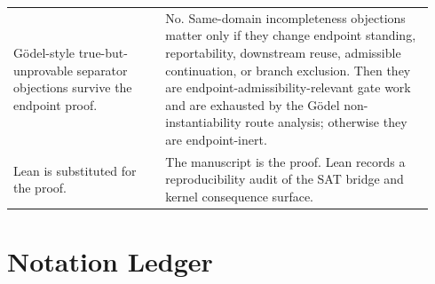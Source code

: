 \documentclass[11pt]{article}
\theoremstyle{definition}
\theoremstyle{remark}
\begin{document}
{\begin{longtable}{>{\raggedright\arraybackslash}p{0.34\linewidth}>{\raggedright\arraybackslash}p{0.60\linewidth}}
G\"odel-style true-but-unprovable separator objections survive the endpoint proof. & No. Same-domain incompleteness objections matter only if they change endpoint standing, reportability, downstream reuse, admissible continuation, or branch exclusion. Then they are endpoint-admissibility-relevant gate work and are exhausted by the G\"odel non-instantiability route analysis; otherwise they are endpoint-inert. \\
Lean is substituted for the proof. & The manuscript is the proof. Lean records a reproducibility audit of the SAT bridge and kernel consequence surface. \\
\bottomrule
\end{longtable}
}

\section{Notation Ledger}
\end{document}
